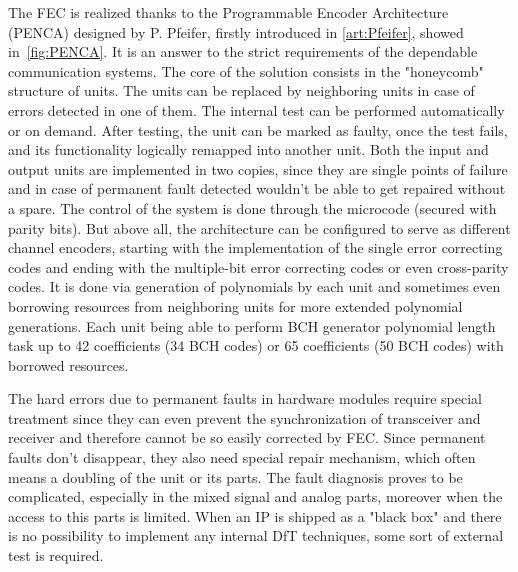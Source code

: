 The FEC is realized thanks to the Programmable Encoder Architecture (PENCA) designed by P. Pfeifer, firstly introduced in \ref{art:Pfeifer}, showed in~\autoref{fig:PENCA}. It is an answer to the strict requirements of the dependable communication systems. The core of the solution consists in the "honeycomb" structure of units. The units can be replaced by neighboring units in case of errors detected in one of them. The internal test can be performed automatically or on demand. After testing, the unit can be marked as faulty, once the test fails, and its functionality logically remapped into another unit. Both the input and output units are implemented in two copies, since they are single points of failure and in case of permanent fault detected wouldn't be able to get repaired without a spare. The control of the system is done through the microcode (secured with parity bits). But above all, the architecture can be configured to serve as different channel encoders, starting with the implementation of the single error correcting codes and ending with the multiple-bit error correcting codes or even cross-parity codes. It is done via generation of polynomials by each unit and sometimes even borrowing resources from neighboring units for more extended polynomial generations. Each unit being able to perform BCH generator polynomial length task up to 42 coefficients (34 BCH codes) or 65 coefficients (50 BCH codes) with borrowed resources.

The hard errors due to permanent faults in hardware modules require special treatment since they can even prevent the synchronization of transceiver and receiver and therefore cannot be so easily corrected by FEC. Since permanent faults don't disappear, they also need special repair mechanism, which often means a doubling of the unit or its parts. The fault diagnosis proves to be complicated, especially in the mixed signal and analog parts, moreover when the access to this parts is limited. When an IP is shipped as a "black box" and there is no possibility to implement any internal DfT techniques, some sort of external test is required. 

